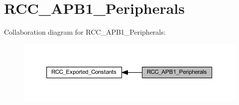 \hypertarget{group___r_c_c___a_p_b1___peripherals}{}\section{R\+C\+C\+\_\+\+A\+P\+B1\+\_\+\+Peripherals}
\label{group___r_c_c___a_p_b1___peripherals}
Collaboration diagram for R\+C\+C\+\_\+\+A\+P\+B1\+\_\+\+Peripherals\+:\nopagebreak
\begin{figure}[H]
\begin{center}
\leavevmode
\includegraphics[width=350pt]{group___r_c_c___a_p_b1___peripherals}
\end{center}
\end{figure}
